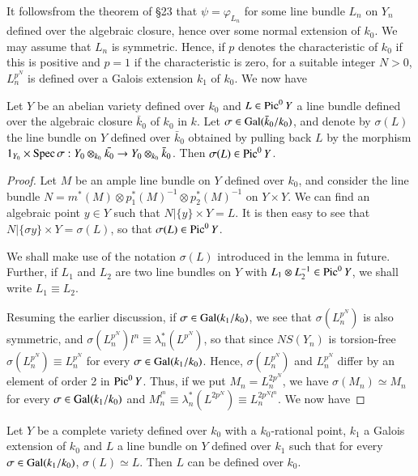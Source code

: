 It follows\pageoriginale from the theorem of \S 23 that $\psi = \varphi_{L_n}$ for some line bundle $L_n$ on $Y_n$ defined over the algebraic closure, hence over some normal extension of $k_0$. We may assume that $L_n$ is symmetric. Hence, if $p$ denotes the characteristic of $k_0$ if this is positive and $p=1$ if the characteristic is zero, for a suitable integer $N >0$, $L^{p^N}_n$ is defined over a Galois extension $k_1$ of $k_0$. We now have
 
\begin{lem}\label{apen1-lem3}
Let $Y$ be an abelian variety defined over $k_0$ and $L \in \operatorname{Pic}^0 Y$ a line bundle defined over the algebraic closure $\bar{k}_0$ of $k_0$ in $k$. Let $\sigma \in \operatorname{Gal}   (\bar{k}_0 / k_0)$, and denote by $\sigma (L)$ the line bundle on $Y$ defined over $\bar{k}_0$ obtained by pulling back $L$ by the morphism $1_{Y_0} \times \operatorname{Spec} \sigma: Y_0 \otimes_{k_0} \bar{k_0} \to Y_0 \otimes_{k_0} \bar{k}_0$. Then $\sigma (L) \in \operatorname{Pic}^0 Y$.
\end{lem}

\begin{proof}
Let $M$ be an ample line bundle on $Y$ defined over $k_0$, and consider the line bundle $N = m^* (M) \otimes p^*_1 (M)^{-1} \otimes p^*_2 (M)^{-1}$ on $Y \times Y$. We can find an algebraic point $y \in Y$ such that $N | \{y\} \times Y = L$. It is then easy to see that $N | \{\sigma y\} \times Y = \sigma (L)$, so that $\sigma(L) \in \operatorname{Pic}^0 Y$.

We shall make use of the notation $\sigma (L)$ introduced in the lemma in future. Further, if $L_1$ and $L_2$ are two line bundles on $Y$ with $L_1 \otimes L^{-1}_2 \in \operatorname{Pic}^0 Y$, we shall write $L_1 \equiv L_2$.

Resuming the earlier discussion, if $\sigma \in \operatorname{Gal} (k_1/ k_0)$, we see that $\sigma (L^{p^N}_n)$ is also symmetric, and $\sigma (L^{p^N}_n)l^n \equiv \lambda^*_n (L^{p^N})$, so that since $NS(Y_n)$ is torsion-free $\sigma (L^{p^N}_n ) \equiv L^{p^N}_n$ for every $\sigma \in \operatorname{Gal} (k_1/ k_0)$. Hence, $\sigma (L^{p^N}_n)$ and $L^{p^N}_n$ differ by an element of order 2 in $\operatorname{Pic}^0 Y$. Thus, if we put $M_n = L^{2p^N}_n$, we have $\sigma (M_n ) \simeq M_n$ for every $\sigma \in \operatorname{Gal} (k_1/k_0)$ and $M^{l^n}_n \equiv \lambda^*_n (L^{2p^N}) \equiv L^{2p^N l^n}_n$. We now have
\end{proof}

\begin{lem}\label{apen1-lem4}
Let $Y$ be a complete variety defined over $k_0$ with a $k_0$-rational point, $k_1$ a Galois extension of $k_0$ and $L$ a line bundle on $Y$ defined over $k_1$ such that for every $\sigma \in \operatorname{Gal} (k_1/k_0)$, $\sigma (L) \simeq L$. Then $L$ can be defined over $k_0$.
\end{lem}

